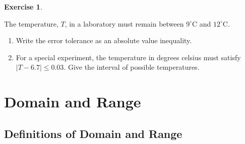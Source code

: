 \documentclass[10pt,]{book}
\theoremstyle{plain}
\theoremstyle{definition}
\theoremstyle{definition}
\theoremstyle{definition}
\theoremstyle{definition}
\theoremstyle{definition}
\newtheorem{exercise}[theorem]{Exercise}
\numberwithin{equation}{section}
\newcommand\abs[1]{\left|#1\right|}
\newcommand\degree[0]{^{\circ}}
\begin{document}
\begin{exercise}\label{exercise-tolerance-temperature}

    The temperature, \(T\), in a laboratory must remain between \(9\degree\)C and \(12\degree\)C.
    \leavevmode%
\begin{enumerate}[label=*\alph**]
\item\hypertarget{li-373}{}Write the error tolerance as an absolute value inequality.\item\hypertarget{li-374}{}For a special experiment, the temperature in degrees celsius must satisfy \(\abs{T − 6.7} ≤ 0.03\). Give the interval of possible temperatures.\end{enumerate}
\end{exercise}
\typeout{************************************************}
\typeout{************************************************}
\section[Domain and Range]{Domain and Range}\label{Domain-Range}
\typeout{************************************************}
\typeout{************************************************}
\subsection[Definitions of Domain and Range]{Definitions of Domain and Range}\label{subsection-52}
\end{document}
